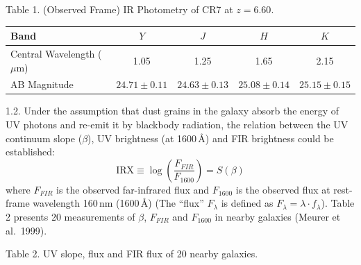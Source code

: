 Table 1. (Observed Frame) IR Photometry of CR7 at $z = 6.60$.

\begin{center}
\begin{tabular}{l|c|c|c|c}
Band & $Y$ & $J$ & $H$ & $K$ \\
\hline
Central Wavelength ($\mu$m) & 1.05 & 1.25 & 1.65 & 2.15 \\
AB Magnitude & $24.71 \pm 0.11$ & $24.63 \pm 0.13$ & $25.08 \pm 0.14$
  & $25.15 \pm 0.15$ \\
\end{tabular}
\end{center}

1.2. Under the assumption that dust grains in the galaxy absorb the energy of
UV photons and re-emit it by blackbody radiation, the relation between the UV
continuum slope ($\beta$), UV brightness (at 1600\,\AA) and FIR brightness
could be established:
\[ \mathrm{IRX} \equiv \log\!\left(\frac{F_{FIR}}{F_{1600}}\right)
   = S(\beta) \]
where $F_{FIR}$ is the observed far-infrared flux and $F_{1600}$ is the
observed flux at rest-frame wavelength 160\,nm (1600\,\AA) (The ``flux''
$F_\lambda$ is defined as $F_\lambda = \lambda \cdot f_\lambda$). Table 2
presents 20 measurements of $\beta$, $F_{FIR}$ and $F_{1600}$ in nearby
galaxies (Meurer et al.\ 1999).

Table 2. UV slope, flux and FIR flux of 20 nearby galaxies.

